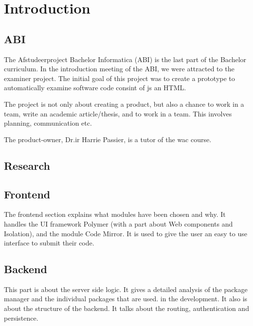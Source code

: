 \chapter{Introduction}


\section{ABI}
The Afstudeerproject Bachelor Informatica (ABI) is the last part of the Bachelor curriculum.
In the introduction meeting of the ABI, we were attracted to the \gls{examiner} project.
The initial goal of this project was to create a prototype to automatically examine
software code consint of \gls{js} an HTML.

The project is not only about creating a product, but also a chance to work in a team, write an academic article/thesis, and to work in a team. This involves planning, communication etc.

The product-owner, Dr.ir Harrie Passier, is a tutor of the \gls{wac} course.



\section{Research}


\section{Frontend}
The frontend section explains what modules have been chosen and why.
It handles the UI framework Polymer (with a part about Web components and
Isolation), and the module Code Mirror.
It is used to give
the user an easy to use interface to submit their code.

\section{Backend}
This part is about the server side logic. It gives a detailed analysis of the
package manager and the individual packages that are used.
in the development. It also is about the structure of the backend.
It talks about the routing, authentication and persistence.

 


